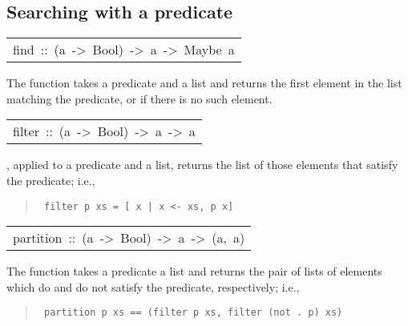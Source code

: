 \subsection{Searching with a predicate
}
\begin{haddockdesc}
\item[\begin{tabular}{@{}l}
find\ ::\ (a\ ->\ Bool)\ ->\ {\char 91}a{\char 93}\ ->\ Maybe\ a
\end{tabular}]\haddockbegindoc
The  function takes a predicate and a list and returns the
 first element in the list matching the predicate, or  if
 there is no such element.
\par

\end{haddockdesc}
\begin{haddockdesc}
\item[\begin{tabular}{@{}l}
filter\ ::\ (a\ ->\ Bool)\ ->\ {\char 91}a{\char 93}\ ->\ {\char 91}a{\char 93}
\end{tabular}]\haddockbegindoc
{}, applied to a predicate and a list, returns the list of
 those elements that satisfy the predicate; i.e.,
\par
\begin{quote}
{\haddockverb\begin{verbatim}
 filter p xs = [ x | x <- xs, p x]
\end{verbatim}}
\end{quote}

\end{haddockdesc}
\begin{haddockdesc}
\item[\begin{tabular}{@{}l}
partition\ ::\ (a\ ->\ Bool)\ ->\ {\char 91}a{\char 93}\ ->\ ({\char 91}a{\char 93},\ {\char 91}a{\char 93})
\end{tabular}]\haddockbegindoc
The  function takes a predicate a list and returns
 the pair of lists of elements which do and do not satisfy the
 predicate, respectively; i.e.,
\par
\begin{quote}
{\haddockverb\begin{verbatim}
 partition p xs == (filter p xs, filter (not . p) xs)
\end{verbatim}}
\end{quote}

\end{haddockdesc}
